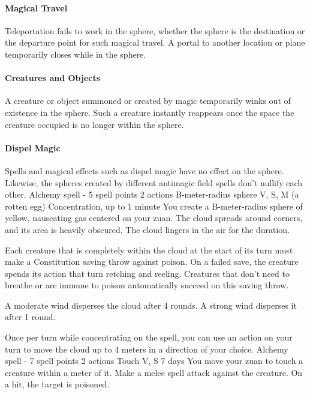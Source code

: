        \paragraph{Magical Travel}
        Teleportation fails to work in the sphere, whether the sphere is the destination or the departure point for such magical travel.
        A portal to another location or plane  temporarily closes while in the sphere.

        \paragraph{Creatures and Objects}
        A creature or object summoned or created by magic temporarily winks out of existence in the sphere.
        Such a creature instantly reappears once the space the creature occupied is no longer within the sphere.

        \paragraph{Dispel Magic}
        Spells and magical effects such as dispel magic have no effect on the sphere.
        Likewise, the spheres created by different antimagic field spells don't nullify each other.
        {Alchemy spell - 5 spell points}
        {2 actions}
        {B-meter-radius sphere}
        {V, S, M (a rotten egg)}
        {Concentration, up to 1 minute}
        You create a B-meter-radius sphere of yellow, nauseating gas centered on your zuan.
        The cloud spreads around corners, and its area is heavily obscured.
        The cloud lingers in the air for the duration.

        Each creature that is completely within the cloud at the start of its turn must make a Constitution saving throw against poison.
        On a failed save, the creature spends its action that turn retching and reeling.
        Creatures that don't need to breathe or are immune to poison automatically succeed on this saving throw.

        A moderate wind disperses the cloud after 4 rounds.
        A strong wind disperses it after 1 round.

        Once per turn while concentrating on the spell, you can use an action on your turn to move the cloud up to 4 meters in a direction of your choice.
        {Alchemy spell - 7 spell points}
        {2 actions}
        {Touch}
        {V, S}
        {7 days}
        You move your zuan to touch a creature within a meter of it.
        Make a melee spell attack against the creature.
        On a hit, the target is poisoned.

